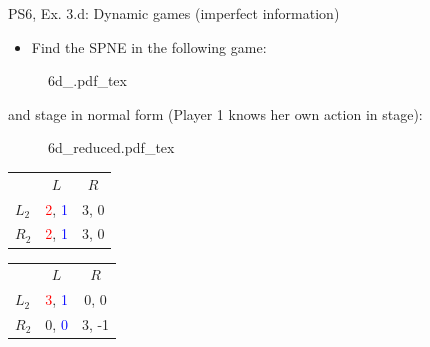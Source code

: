 \begin{frame}{PS6, Ex. 3.d: Dynamic games (imperfect information)}
    \begin{itemize}
      \item[(d)] Find the SPNE in the following game:
    \end{itemize}
    \vspace{-4pt}
    \begin{figure}[!h]
      \center
      \def\svgwidth{.8\columnwidth}
      {6d_.pdf_tex}
    \end{figure}
    \vspace{-4pt}
     and  stage in normal form (Player 1 knows her own action in  stage):
    \vspace{-4pt}
    \begin{figure}[!h]
      \center
      \def\svgwidth{.25\columnwidth}
      {6d_reduced.pdf_tex}
    \end{figure}
    \vspace{-9pt}
    \begin{table}
      \begin{tabular}{l|c|c|}
        \multicolumn{1}{c}{} & \multicolumn{1}{c}{\color{blue}$L$} & \multicolumn{1}{c}{$R$} \\\cline{2-3}
        $L_2$ & \textcolor{red}{2}, \textcolor{blue}{1} & 3, 0 \\\cline{2-3}
        $R_2$ & \textcolor{red}{2}, \textcolor{blue}{1} & 3, 0 \\\cline{2-3}
      \end{tabular}
      \enskip
      \begin{tabular}{l|c|c|}
        \multicolumn{1}{c}{} & \multicolumn{1}{c}{\color{blue}$L$} & \multicolumn{1}{c}{$R$} \\\cline{2-3}
        $L_2$ & \textcolor{red}{3}, \textcolor{blue}{1} & 0, 0 \\\cline{2-3}
        $R_2$ & 0, \textcolor{blue}{0} & 3, -1 \\\cline{2-3}
      \end{tabular}
    \end{table}
    \vfill\null
\end{frame}
